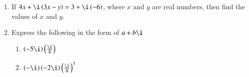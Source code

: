 \begin{enumerate}[label=\thesubsection.\arabic*, ref=\thesubsection.\theenumi]
	\item If $4x + \i\brak{3x-y} = 3 + \i\brak{-6}$, where $x$ and $y$ are real numbers, then find the values of $x$ and $y$.
	\item Express the following in the form of $a+b\i$
		\begin{enumerate}
			\item $\brak{-5\i}\brak{\frac{\i}{8}}$
			\item $\brak{-\i}\brak{-2\i}\brak{\frac{\i}{8}}^3$
		\end{enumerate}
\end{enumerate}
\iffalse
Solve
\begin{enumerate}[label=\thesubsection.\arabic*, ref=\thesubsection.\theenumi,resume*]
	\begin{multicols}{2}
	\end{multicols}
\end{enumerate}
\fi
